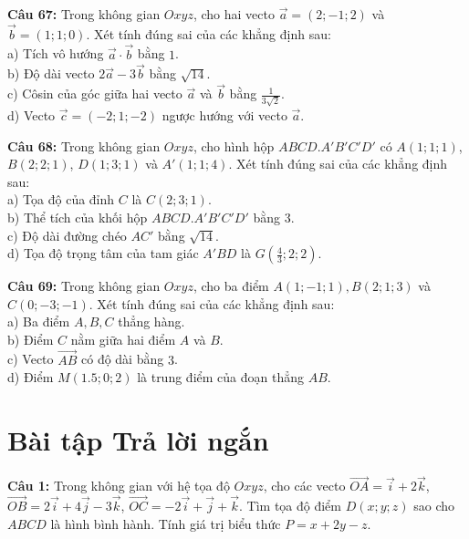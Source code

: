 \documentclass[12pt]{article}
\begin{document}
	\vspace{4mm}
	\noindent \textbf{Câu 67:} Trong không gian $Oxyz$, cho hai vecto $\vec{a} = (2; -1; 2)$ và $\vec{b} = (1; 1; 0)$. Xét tính đúng sai của các khẳng định sau: \\
	\noindent a) Tích vô hướng $\vec{a} \cdot \vec{b}$ bằng $1$. \\
	\noindent b) Độ dài vecto $2\vec{a} - 3\vec{b}$ bằng $\sqrt{14}$. \\
	\noindent c) Côsin của góc giữa hai vecto $\vec{a}$ và $\vec{b}$ bằng $\frac{1}{3\sqrt{2}}$. \\
	\noindent d) Vecto $\vec{c} = (-2; 1; -2)$ ngược hướng với vecto $\vec{a}$.
	
	\vspace{4mm}
	\noindent \textbf{Câu 68:} Trong không gian $Oxyz$, cho hình hộp $ABCD.A'B'C'D'$ có $A(1; 1; 1)$, $B(2; 2; 1)$, $D(1; 3; 1)$ và $A'(1; 1; 4)$. Xét tính đúng sai của các khẳng định sau: \\
	\noindent a) Tọa độ của đỉnh $C$ là $C(2; 3; 1)$. \\
	\noindent b) Thể tích của khối hộp $ABCD.A'B'C'D'$ bằng $3$. \\
	\noindent c) Độ dài đường chéo $AC'$ bằng $\sqrt{14}$. \\
	\noindent d) Tọa độ trọng tâm của tam giác $A'BD$ là $G\left(\frac{4}{3}; 2; 2\right)$.
	
	\vspace{4mm}
	\noindent \textbf{Câu 69:} Trong không gian $Oxyz$, cho ba điểm $A(1; -1; 1), B(2; 1; 3)$ và $C(0; -3; -1)$. Xét tính đúng sai của các khẳng định sau: \\
	\noindent a) Ba điểm $A, B, C$ thẳng hàng. \\
	\noindent b) Điểm $C$ nằm giữa hai điểm $A$ và $B$. \\
	\noindent c) Vecto $\vec{AB}$ có độ dài bằng $3$. \\
	\noindent d) Điểm $M(1.5; 0; 2)$ là trung điểm của đoạn thẳng $AB$.
	
	\section{Bài tập Trả lời ngắn}
	\noindent \textbf{Câu 1:} Trong không gian với hệ tọa độ $Oxyz$, cho các vecto $\vec{OA} = \vec{i} + 2\vec{k}$, $\vec{OB} = 2\vec{i} + 4\vec{j} - 3\vec{k}$, $\vec{OC} = -2\vec{i} + \vec{j} + \vec{k}$. Tìm tọa độ điểm $D(x; y; z)$ sao cho $ABCD$ là hình bình hành. Tính giá trị biểu thức $P = x + 2y - z$. \\
	
\end{document}
